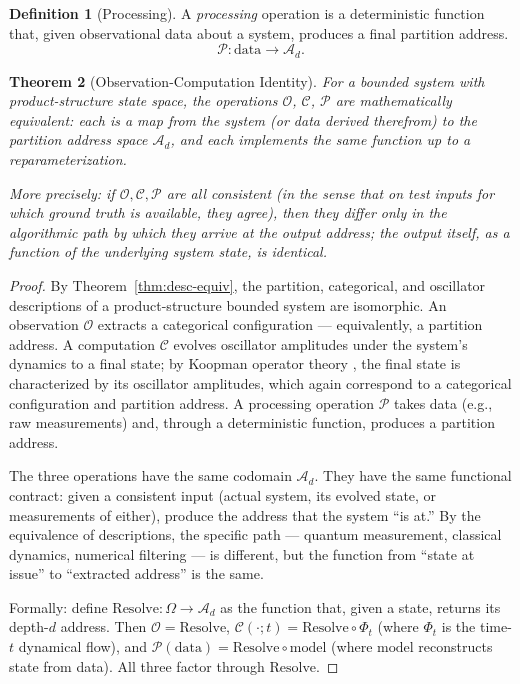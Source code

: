 \documentclass[11pt,a4paper]{article}
\newtheorem{theorem}{Theorem}[section]
\theoremstyle{definition}
\newtheorem{definition}[theorem]{Definition}
\theoremstyle{remark}
\newcommand{\Oc}{\mathcal{O}}
\newcommand{\Cc}{\mathcal{C}}
\newcommand{\Pc}{\mathcal{P}}
\newcommand{\Ac}{\mathcal{A}}
\begin{document}
\begin{definition}[Processing]
\label{def:proc}
A \emph{processing} operation is a deterministic function that, given observational data about a system, produces a final partition address.
\[
\Pc: \text{data} \to \Ac_d.
\]
\end{definition}

\begin{theorem}[Observation-Computation Identity]
\label{thm:oci}
For a bounded system with product-structure state space, the operations $\Oc$, $\Cc$, $\Pc$ are mathematically equivalent: each is a map from the system (or data derived therefrom) to the partition address space $\Ac_d$, and each implements the same function up to a reparameterization.

More precisely: if $\Oc, \Cc, \Pc$ are all consistent (in the sense that on test inputs for which ground truth is available, they agree), then they differ only in the algorithmic path by which they arrive at the output address; the output itself, as a function of the underlying system state, is identical.
\end{theorem}

\begin{proof}
By Theorem~\ref{thm:desc-equiv}, the partition, categorical, and oscillator descriptions of a product-structure bounded system are isomorphic. An observation $\Oc$ extracts a categorical configuration --- equivalently, a partition address. A computation $\Cc$ evolves oscillator amplitudes under the system's dynamics to a final state; by Koopman operator theory \citep{koopman1931hamiltonian, mezic2005spectral}, the final state is characterized by its oscillator amplitudes, which again correspond to a categorical configuration and partition address. A processing operation $\Pc$ takes data (e.g., raw measurements) and, through a deterministic function, produces a partition address.

The three operations have the same codomain $\Ac_d$. They have the same functional contract: given a consistent input (actual system, its evolved state, or measurements of either), produce the address that the system ``is at.'' By the equivalence of descriptions, the specific path --- quantum measurement, classical dynamics, numerical filtering --- is different, but the function from ``state at issue'' to ``extracted address'' is the same.

Formally: define $\mathrm{Resolve}: \Omega \to \Ac_d$ as the function that, given a state, returns its depth-$d$ address. Then $\Oc = \mathrm{Resolve}$, $\Cc(\cdot; t) = \mathrm{Resolve} \circ \Phi_t$ (where $\Phi_t$ is the time-$t$ dynamical flow), and $\Pc(\mathrm{data}) = \mathrm{Resolve} \circ \mathrm{model}$ (where $\mathrm{model}$ reconstructs state from data). All three factor through $\mathrm{Resolve}$.
\end{proof}
\end{document}
